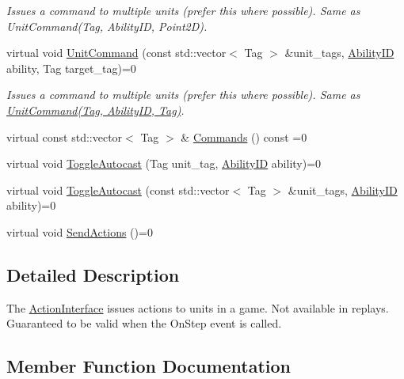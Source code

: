 \begin{DoxyCompactItemize}
\begin{DoxyCompactList}\small\item\em Issues a command to multiple units (prefer this where possible). Same as Unit\+Command(\+Tag, Ability\+I\+D, Point2\+D). \end{DoxyCompactList}\item 
\mbox{\label{classsc2_1_1_action_interface_a3a5fd10e721f25ac756dd2fdb20ebd16}} 
virtual void \hyperlink{classsc2_1_1_action_interface_a3a5fd10e721f25ac756dd2fdb20ebd16}{Unit\+Command} (const std\+::vector$<$ Tag $>$ \&unit\+\_\+tags, \hyperlink{classsc2_1_1_s_c2_type}{Ability\+ID} ability, Tag target\+\_\+tag)=0
\begin{DoxyCompactList}\small\item\em Issues a command to multiple units (prefer this where possible). Same as \hyperlink{classsc2_1_1_action_interface_a5aacde49d90f8d6637ff0b69891448c4}{Unit\+Command(\+Tag, Ability\+I\+D, Tag)}. \end{DoxyCompactList}\item 
virtual const std\+::vector$<$ Tag $>$ \& \hyperlink{classsc2_1_1_action_interface_a29a55f8dd4f9230864caa1deb228ae33}{Commands} () const =0
\item 
virtual void \hyperlink{classsc2_1_1_action_interface_a5f66f9b7eaf1d6a681694927b8605004}{Toggle\+Autocast} (Tag unit\+\_\+tag, \hyperlink{classsc2_1_1_s_c2_type}{Ability\+ID} ability)=0
\item 
virtual void \hyperlink{classsc2_1_1_action_interface_ab3990c306215b3cb8d5e62533f72db62}{Toggle\+Autocast} (const std\+::vector$<$ Tag $>$ \&unit\+\_\+tags, \hyperlink{classsc2_1_1_s_c2_type}{Ability\+ID} ability)=0
\item 
virtual void \hyperlink{classsc2_1_1_action_interface_af054d2a35e7eb740109f63011090ea50}{Send\+Actions} ()=0
\end{DoxyCompactItemize}


\subsection{Detailed Description}
The \hyperlink{classsc2_1_1_action_interface}{Action\+Interface} issues actions to units in a game. Not available in replays. Guaranteed to be valid when the On\+Step event is called. 

\subsection{Member Function Documentation}
\mbox{\label{classsc2_1_1_action_interface_a29a55f8dd4f9230864caa1deb228ae33}} 
